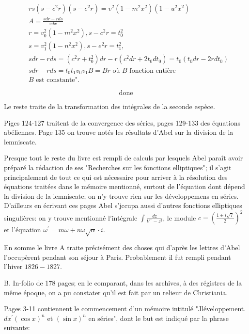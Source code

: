 \documentclass{article}
\begin{document}

\[
\begin{aligned}
& r s\left(s-c^{2} r\right)\left(s-e^{2} r\right)=v^{2}\left(1-m^{2} x^{2}\right)\left(1-u^{2} x^{2}\right) \\
& A=\frac{s d r-r d s}{v d x} \\
& r=v_{0}^{2}\left(1-m^{2} x^{2}\right), s-c^{2} r=t_{0}^{2} \\
& s=v_{1}^{2}\left(1-n^{2} x^{2}\right), s-e^{2} r=t_{1}^{2}, \\
& s d r-r d s=\left(c^{2} r+t_{0}^{2}\right) d r-r\left(c^{2} d r+2 t_{0} d t_{0}\right)=t_{0}\left(t_{0} d r-2 r d t_{0}\right) \\
& s d r-r d s=t_{0} t_{1} v_{0} v_{1} B=B r \text { où } B \text { fonction entière } \\
& B \text { est constante". }
\end{aligned}
\]

\[
\text { done }
\]

Le reste traite de la transformation des intégrales de la seconde espèce.

Piges 124-127 traitent de la convergence des séries, pages 129-133 des équations abéliennes. Page 135 on trouve notés les résultats d'Abel sur la division de la lemniscate.

Presque tout le reste du livre est rempli de calculs par lesquels Abel paraît avoir préparé la rédaction de ses "Recherches sur les fonctions elliptiques"; il s'agit principalement de tout ce qui est nécessaire pour arriver à la résolution des équations traitées dans le mémoire mentionné, surtout de l'équation dont dépend la division de la lemniscate; on n'y trouve rien sur les développemens en séries. D'ailleurs en écrivant ces pages Abel s'jccupa aussi d'autres fonctions elliptiques singulières: on y trouve mentionné l'intégrale \(\int \frac{d z}{V^{-}-z^{3}}\), le module \(c=\left(\frac{1 \pm i \sqrt{7}}{2}\right)^{2}\) et l'équation \(\omega^{\prime}=m \omega+n \omega \sqrt{\alpha} \cdot i\).

En somme le livre A traite précisément des choses qui d'après les lettres d'Abel l'occupèrent pendant son séjour à Paris. Probablement il fut rempli pendant l'hiver \(1826-1827\).

B. In-folio de 178 pages; en le comparant, dans les archives, à des régistres de la même époque, on a pu constater qu'il est fait par un relieur de Christiania.

Pages 3-11 contiennent le commencement d'un mémoire intitulé "Jléveloppement. \(d x^{\prime}(\cos x)^{n}\) et \((\sin x)^{n}\) en séries", dont le but est indiqué par la phrase suivante:
\end{document}
